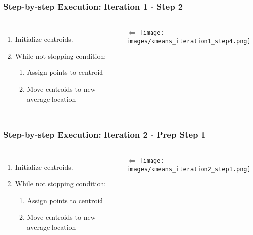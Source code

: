 \documentclass{beamer}
\begin{document}
\begin{frame}
  \frametitle{Step-by-step Execution: Iteration 1 - Step 2 }
  \begin{columns}
      \begin{enumerate}
        \item Initialize centroids. \vspace{2mm}
        \item While not stopping condition: \vspace{2mm}
        \begin{enumerate}
          \item Assign points to centroid \vspace{2mm}
          \item Move centroids to new average location
        \end{enumerate}
      \end{enumerate}
      \vspace{39mm} $\Longleftarrow$
      \texttt{[image: images/kmeans\_iteration1\_step4.png]}
  \end{columns}
\end{frame}

\begin{frame}
  \frametitle{Step-by-step Execution: Iteration 2 - Prep Step 1}
  \begin{columns}
      \begin{enumerate}
        \item Initialize centroids. \vspace{2mm}
        \item While not stopping condition: \vspace{2mm}
        \begin{enumerate}
          \item Assign points to centroid \vspace{2mm}
          \item Move centroids to new average location
        \end{enumerate}
      \end{enumerate}
      \vspace{1mm} $\Longleftarrow$
      \texttt{[image: images/kmeans\_iteration2\_step1.png]}
  \end{columns}
\end{frame}
\end{document}
